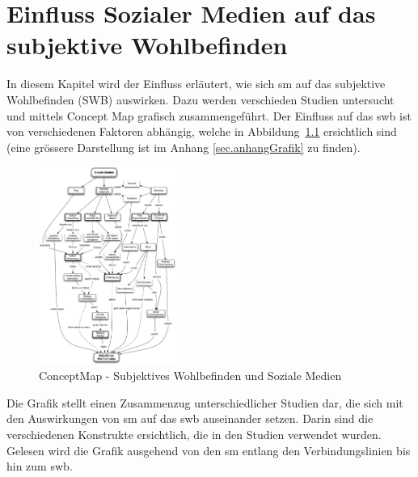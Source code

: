 %
%
\thispagestyle{empty}
\chapter{Einfluss Sozialer Medien auf das subjektive Wohlbefinden}\label{chap.einfluss}
In diesem Kapitel wird der Einfluss erläutert, wie sich \gls{sm} auf das subjektive Wohlbefinden (SWB) auswirken. Dazu werden verschieden Studien untersucht und mittels Concept Map grafisch zusammengeführt. Der Einfluss auf das \gls{swb} ist von verschiedenen Faktoren abhängig, welche in Abbildung~\ref{fig.ConceptMapSwbSm} ersichtlich sind (eine grössere Darstellung ist im Anhang \ref{sec.anhangGrafik} zu finden).
\begin{figure}[h]
	\centering
		\includegraphics[width=0.4\textwidth]{images/grafiken/conceptMap_Swb_Sm_v2.pdf}
	\caption{ConceptMap - Subjektives Wohlbefinden und Soziale Medien}
	\label{fig.ConceptMapSwbSm}
\end{figure} \newline
Die Grafik stellt einen Zusammenzug unterschiedlicher Studien dar, die sich mit den Auswirkungen von \gls{sm} auf das \gls{swb} auseinander setzen. Darin sind die verschiedenen Konstrukte ersichtlich, die in den Studien verwendet wurden. Gelesen wird die Grafik ausgehend von den \gls{sm} entlang den Verbindungslinien bis hin zum \gls{swb}.\newline
